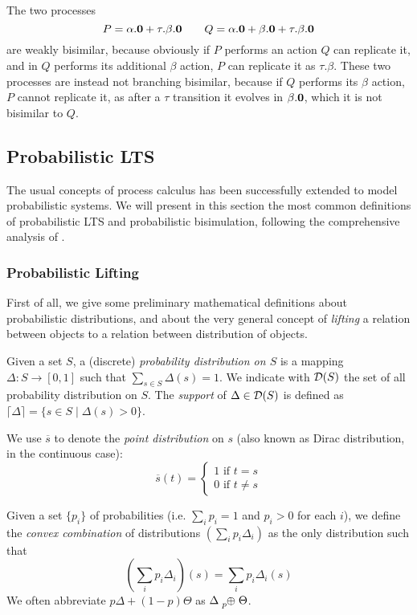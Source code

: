 The two processes \[P = \alpha.\mathbf{0} + \tau.\beta.\mathbf{0} \qquad Q = \alpha.\mathbf{0} + \beta.\mathbf{0} + \tau.\beta.\mathbf{0}\] are weakly bisimilar, because obviously if $P$ performs an action $Q$ can replicate it, and in $Q$ performs its additional $\beta$ action, $P$ can replicate it as $\tau.\beta$. These two processes are instead not branching bisimilar, because if $Q$ performs its $\beta$ action, $P$ cannot replicate it, as after a $\tau$ transition it evolves in $\beta.\mathbf{0}$, which it is not bisimilar to $Q$.

\subsection{Probabilistic LTS} \label{pLTS}

The usual concepts of process calculus has been successfully extended to model probabilistic systems. We will present in this section the most common definitions of probabilistic LTS and probabilistic bisimulation, following the comprehensive analysis of \cite{hennessyExploringProbabilisticBisimulations2012, dengLogicalMetricAlgorithmic2011}.

\subsubsection{Probabilistic Lifting}
First of all, we give some preliminary mathematical definitions about probabilistic distributions, and about the very general concept of \textit{lifting} a relation between objects to a relation between distribution of objects.

Given a set $S$, a (discrete) \textit{probability distribution on $S$} is a mapping $\Delta: S \rightarrow [0, 1]$ such that $\sum_{s\in S} \Delta(s) = 1$. We indicate with $\mathcal{D}(S)$ the set of all probability distribution on $S$.
The \textit{support} of $\Delta \in \mathcal{D}(S)$ is defined as $\lceil\Delta\rceil = \{s \in S \mid \Delta(s) > 0\}$.

We use $\overline{s}$ to denote the \textit{point distribution} on $s$ (also known as Dirac distribution, in the continuous case):
\[
	\overline{s}(t) = 
	\begin{cases} 1 \text{ if }t = s \\
	0 \text{ if } t\neq s
	\end{cases}
\]

Given a set $\{p_i\}$ of probabilities (i.e. $\sum_i p_i = 1$ and $p_i > 0$ for each $i$), we define the \textit{convex combination} of distributions $\left(\sum_i p_i \Delta_i\right)$ as the only 
distribution such that
\[
\left(\sum_i p_i \Delta_i\right)(s) = \sum_i p_i \Delta_i(s)
\]
We often abbreviate $p \Delta + (1-p) \Theta$ as $\Delta \psum{p} \Theta$.

